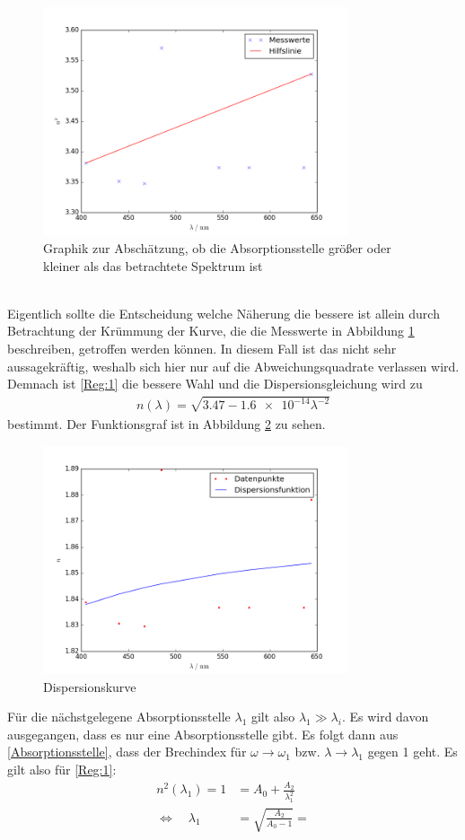 \begin{figure}
	\centering
	\includegraphics[width=0.8\textwidth]{Tendenz.png}
	\caption{Graphik zur Abschätzung, ob die Absorptionsstelle größer oder kleiner als das betrachtete Spektrum ist}
	\label{Abb:Krummung}
\end{figure} \\
Eigentlich sollte die Entscheidung welche Näherung die bessere ist allein durch Betrachtung der Krümmung der Kurve, die die Messwerte in Abbildung \ref{Abb:Krummung} beschreiben, getroffen werden können. In diesem Fall ist das nicht sehr aussagekräftig, weshalb sich hier nur auf die Abweichungsquadrate verlassen wird. Demnach ist \eqref{Reg:1} die bessere Wahl und die Dispersionsgleichung wird zu
\begin{align*}
	n(\lambda) = \sqrt{3.47 - \SI{1.6e-14}\lambda^{-2}}
\end{align*}
bestimmt. Der Funktionsgraf ist in Abbildung \ref*{fig:DispKurve} zu sehen.
\begin{figure}[h!]
	\centering
	\includegraphics[width=0.8\textwidth]{Dispersionskurve.png}
	\caption{Dispersionskurve}
	\label{fig:DispKurve}
\end{figure}
Für die nächstgelegene Absorptionsstelle $\lambda_1$ gilt also $\lambda_1\gg\lambda_i$. Es wird davon ausgegangen, dass es nur eine Absorptionsstelle gibt. Es folgt dann aus \eqref{Absorptionsstelle}, dass der Brechindex für $\omega\rightarrow\omega_1$ bzw. $\lambda\rightarrow\lambda_1$ gegen 1 geht. Es gilt also für \eqref{Reg:1}:
\begin{align*}
	n^2(\lambda_1) = 1 &= A_0 + \frac{A_2}{\lambda_1^2} \\
	\Leftrightarrow\quad \lambda_1 &= \sqrt{\frac{A_2}{A_0-1}} = 
\end{align*}
\clearpage
